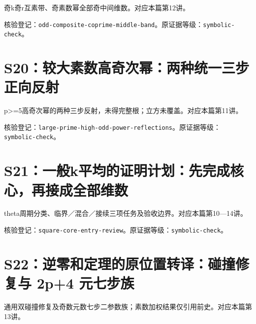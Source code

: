 奇k奇r互素带、奇素数幂全部奇中间维数。对应本篇第12讲。

\par{}\par

核验登记：{\small\nolinkurl{odd-composite-coprime-middle-band}}。原证据等级：{\small\nolinkurl{symbolic-check}}。

\section{S20：较大素数高奇次幂：两种统一三步正向反射}\label{source:S20}

p>=5高奇次幂的两种三步反射，未得完整根；立方未覆盖。对应本篇第11讲。

\par{}\par

核验登记：{\small\nolinkurl{large-prime-high-odd-power-reflections}}。原证据等级：{\small\nolinkurl{symbolic-check}}。

\section{S21：一般k平均的证明计划：先完成核心，再接成全部维数}\label{source:S21}

theta周期分类、临界／混合／接续三项任务及验收边界。对应本篇第10—14讲。

\par{}\par

核验登记：{\small\nolinkurl{square-core-entry-review}}。原证据等级：{\small\nolinkurl{symbolic-check}}。

\section{S22：逆零和定理的原位置转译：碰撞修复与 2p+4 元七步族}\label{source:S22}

通用双碰撞修复及奇数元数七步二参数族；素数加权结果仅引用前史。对应本篇第13讲。

\par{}\par

